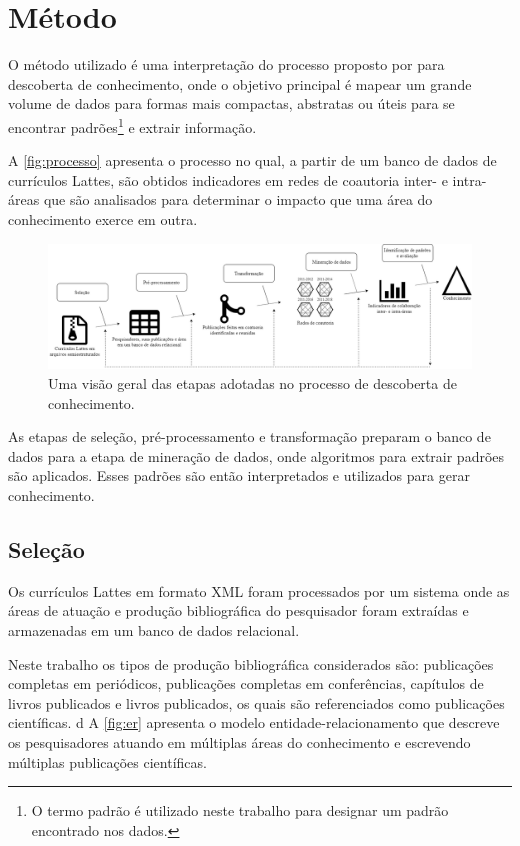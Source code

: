 \chapter[Método]{Método}

O método utilizado é uma interpretação do processo proposto por  para descoberta de conhecimento, onde o objetivo principal é mapear um grande volume de dados para formas mais compactas, abstratas ou úteis para se encontrar padrões\footnote{O termo padrão é utilizado neste trabalho para designar um padrão encontrado nos dados.} e extrair informação.

A \autoref{fig:processo} apresenta o processo no qual, a partir de um banco de dados de currículos Lattes, são obtidos indicadores em redes de coautoria inter- e intra-áreas que são analisados para determinar o impacto que uma área do conhecimento exerce em outra.

\begin{figure}[htpb]
  \centering
  \includegraphics[scale=.3]{figuras/diagrama-fayyad}
  \caption{Uma visão geral das etapas adotadas no processo de descoberta de conhecimento.}
  \label{fig:processo}
\end{figure}

As etapas de seleção, pré-processamento e transformação preparam o banco de dados para a etapa de mineração de dados, onde algoritmos para extrair padrões são aplicados. Esses padrões são então interpretados e utilizados para gerar conhecimento.

\section{Seleção}

Os currículos Lattes em formato XML foram processados por um sistema onde as áreas de atuação e produção bibliográfica do pesquisador foram extraídas e armazenadas em um banco de dados relacional.

Neste trabalho os tipos de produção bibliográfica considerados são: publicações completas em periódicos, publicações completas em conferências, capítulos de livros publicados e livros publicados, os quais são referenciados como publicações científicas.
d
A \autoref{fig:er} apresenta o modelo entidade-relacionamento que descreve os pesquisadores atuando em múltiplas áreas do conhecimento e escrevendo múltiplas publicações científicas.

